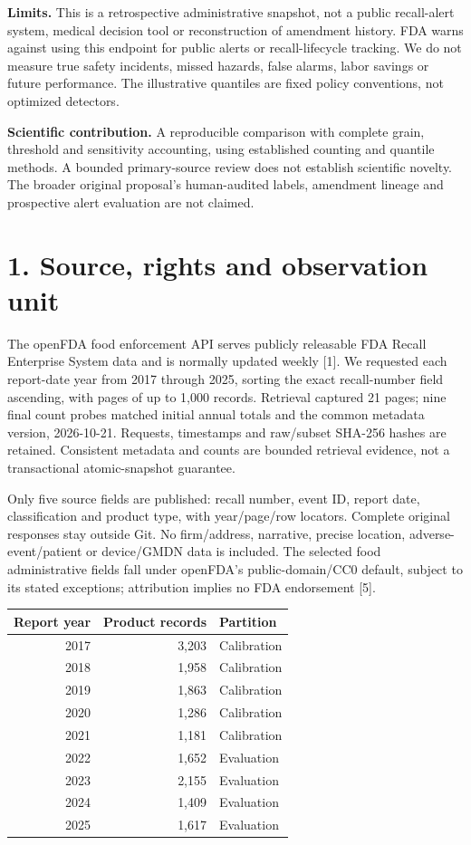 \documentclass[10pt,letterpaper]{article}
\begin{document}
\textbf{Limits.} This is a retrospective administrative snapshot, not a public recall-alert system, medical decision tool or reconstruction of amendment history. FDA warns against using this endpoint for public alerts or recall-lifecycle tracking. We do not measure true safety incidents, missed hazards, false alarms, labor savings or future performance. The illustrative quantiles are fixed policy conventions, not optimized detectors.

\textbf{Scientific contribution.} A reproducible comparison with complete grain, threshold and sensitivity accounting, using established counting and quantile methods. A bounded primary-source review does not establish scientific novelty. The broader original proposal's human-audited labels, amendment lineage and prospective alert evaluation are not claimed.

\clearpage
\section*{1. Source, rights and observation unit}
The openFDA food enforcement API serves publicly releasable FDA Recall Enterprise System data and is normally updated weekly [1]. We requested each report-date year from 2017 through 2025, sorting the exact recall-number field ascending, with pages of up to 1,000 records. Retrieval captured 21 pages; nine final count probes matched initial annual totals and the common metadata version, 2026-10-21. Requests, timestamps and raw/subset SHA-256 hashes are retained. Consistent metadata and counts are bounded retrieval evidence, not a transactional atomic-snapshot guarantee.

Only five source fields are published: recall number, event ID, report date, classification and product type, with year/page/row locators. Complete original responses stay outside Git. No firm/address, narrative, precise location, adverse-event/patient or device/GMDN data is included. The selected food administrative fields fall under openFDA's public-domain/CC0 default, subject to its stated exceptions; attribution implies no FDA endorsement [5].

\begin{center}\begin{tabular}{rrl}\toprule
Report year & Product records & Partition\\\midrule
2017 & 3,203 & Calibration \\
2018 & 1,958 & Calibration \\
2019 & 1,863 & Calibration \\
2020 & 1,286 & Calibration \\
2021 & 1,181 & Calibration \\
2022 & 1,652 & Evaluation \\
2023 & 2,155 & Evaluation \\
2024 & 1,409 & Evaluation \\
2025 & 1,617 & Evaluation \\
\bottomrule\end{tabular}\end{center}
\end{document}
